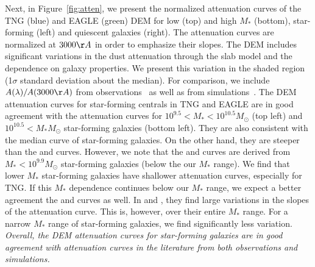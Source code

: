 Next, in Figure~\ref{fig:atten}, we present the normalized attenuation curves 
of the TNG (blue) and EAGLE (green) DEM for low (top) and high $M_*$ (bottom),
star-forming (left) and quiescent galaxies (right). The attenuation curves are
normalized at $3000\AA$ in order to emphasize their slopes. The DEM includes
significant variations in the dust attenuation through the slab model
and the dependence on galaxy properties. We present this variation in the
shaded region (1$\sigma$ standard deviation about the median). For comparison,
we include $A(\lambda)/A(3000\AA)$ from observations~\citep{calzetti2000, battisti2017, salim2018} 
as well as from simulations~\citep{narayanan2018}. The DEM attenuation curves 
for star-forming centrals in TNG and EAGLE are in good agreement with the
\cite{salim2018} attenuation curves for $10^{9.5} < M_* < 10^{10.5}M_\odot$ 
(top left) and $10^{10.5} < M_*M_\odot$ star-forming galaxies (bottom
left). They are also consistent with the median curve of \cite{narayanan2018} 
star-forming galaxies. On the other hand, they are steeper than the
\cite{calzetti2000} and \cite{battisti2017} curves. However, we note that 
the \cite{calzetti2000} and \cite{battisti2017} curves are derived from
$M_* < 10^{9.9}M_\odot$ star-forming galaxies (below the our $M_*$ range).
We find that lower $M_*$ star-forming galaxies have shallower attenuation 
curves, especially for TNG. If this $M_*$ dependence continues below our $M_*$
range, we expect a better agreement the \cite{calzetti2000} and \cite{battisti2017} 
curves as well. In \cite{salim2018} and \cite{narayanan2018}, they find 
large variations in the slopes of the attenuation curve. This is, however, 
over their entire $M_*$ range. For a narrow $M_*$ range of star-forming
galaxies, we find significantly less variation. 
\emph{Overall, the DEM attenuation curves for star-forming galaxies are in good
agreement with attenuation curves in the literature from both observations and
simulations.}


